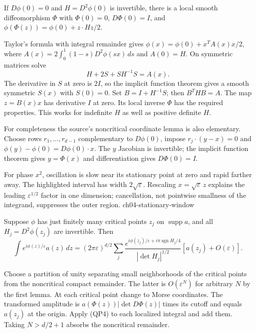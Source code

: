 \begin{lemma}
If $D\phi(0)=0$ and $H=D^2\phi(0)$ is invertible, there is a local
smooth diffeomorphism $\Phi$ with $\Phi(0)=0$, $D\Phi(0)=I$, and
$\phi(\Phi(z))=\phi(0)+z\cdot Hz/2$.
\end{lemma}
\begin{expandedproof}
Taylor's formula with integral remainder gives
$\phi(x)=\phi(0)+x^TA(x)x/2$, where
$A(x)=2\int_0^1(1-s)D^2\phi(sx)\,ds$ and $A(0)=H$.
On symmetric matrices solve
\[
 H+2S+SH^{-1}S=A(x).
\]
The derivative in $S$ at zero is $2I$, so the implicit function
theorem gives a smooth symmetric $S(x)$ with $S(0)=0$.
Set $B=I+H^{-1}S$; then $B^THB=A$.
The map $z=B(x)x$ has derivative $I$ at zero.
Its local inverse $\Phi$ has the required properties.
This works for indefinite $H$ as well as positive definite $H$.
\end{expandedproof}
For completeness the source's noncritical coordinate lemma is also
elementary. Choose rows $r_1,\ldots,r_{d-1}$ complementary to
$D\phi(0)$, impose $r_j\cdot(y-x)=0$ and
$\phi(y)-\phi(0)=D\phi(0)\cdot x$.
The $y$ Jacobian is invertible; the implicit function theorem
gives $y=\Phi(x)$ and differentiation gives $D\Phi(0)=I$.


{For phase $x^2$, oscillation is slow near its stationary point at zero and rapid farther away. The highlighted interval has width $2\sqrt{\varepsilon}$. Rescaling $x=\sqrt{\varepsilon}\,z$ explains the leading $\varepsilon^{1/2}$ factor in one dimension; cancellation, not pointwise smallness of the integrand, suppresses the outer region.}
{ch04-stationary-window}

\begin{theorem}
Suppose $\phi$ has just finitely many critical points $z_j$ on
$\operatorname{supp}a$, and all $H_j=D^2\phi(z_j)$ are invertible.
Then
\[
 \int e^{i\phi(z)/\varepsilon}a(z)\,dz
 =(2\pi\varepsilon)^{d/2}
 \sum_j\frac{e^{i\phi(z_j)/\varepsilon+i\pi\operatorname{sgn}H_j/4}}
                 {|\det H_j|^{1/2}}
                  [a(z_j)+O(\varepsilon)].
 \tag{SP4}
\]
\end{theorem}
\begin{expandedproof}
Choose a partition of unity separating small neighborhoods of the
critical points from the noncritical compact remainder.
The latter is $O(\varepsilon^N)$ for arbitrary $N$ by the first lemma.
At each critical point change to Morse coordinates.
The transformed amplitude is $a(\Phi(z))|\det D\Phi(z)|$
times its cutoff and equals $a(z_j)$ at the origin.
Apply (QP4) to each localized integral and add them.
Taking $N>d/2+1$ absorbs the noncritical remainder.
\end{expandedproof}
\Needspace{45mm}


